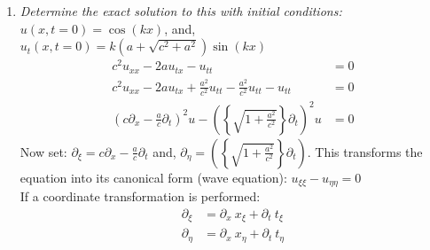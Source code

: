 \documentclass[11pt]{article}
\begin{document}
\begin{enumerate}
\begin{enumerate}[label = (\alph*)]
\item{\color{blue} \textit{Determine the exact solution to this with initial conditions:}} $u(x,t=0) = \cos(kx)$, and, $u_t(x,t=0) = k(a+\sqrt{c^2 + a^2})\sin(kx)$ 
\begin{align*}
c^2u_{xx} -2au_{tx} - u_{tt} & = 0 \\
c^2u_{xx} -2au_{tx} + \frac{a^2}{c^2}u_{tt} - \frac{a^2}{c^2}u_{tt} -u_{tt} & = 0 \\
\left(c\partial_x - \frac{a}{c}\partial_t \right)^2u - \left(\left\{\sqrt{1 + \frac{a^2}{c^2}} \right\}\partial_t \right)^2u & = 0
\end{align*}
Now set: $\partial_\xi = c\partial_x - \frac{a}{c}\partial_t$ and, $\partial_\eta = \left(\left\{\sqrt{1 + \frac{a^2}{c^2}} \right\}\partial_t \right)$. This transforms the equation into its canonical form (wave equation): $u_{\xi\xi} - u_{\eta\eta} = 0$ \\
If a coordinate transformation is performed: 
\begin{align*}
\partial_\xi & = \partial_x \ x_\xi + \partial_t \ t_\xi \\
\partial_\eta & = \partial_x \ x_\eta + \partial_t \  t_\eta \\
\end{align*}


\end{enumerate}
\end{enumerate}
\end{document}
